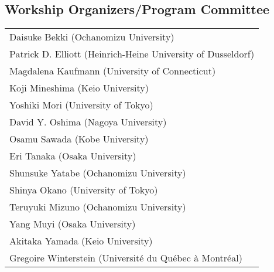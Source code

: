 \documentclass[12pt]{jarticle}
\begin{document}
\subsection*{Workship Organizers/Program Committee}
\begin{flushleft}
\begin{tabular}{l}
Daisuke Bekki (Ochanomizu University) \\
Patrick D. Elliott (Heinrich-Heine University of Dusseldorf) \\
Magdalena Kaufmann (University of Connecticut) \\
Koji Mineshima (Keio University) \\
Yoshiki Mori (University of Tokyo) \\
David Y. Oshima (Nagoya University) \\
Osamu Sawada (Kobe University) \\
Eri Tanaka (Osaka University) \\
Shunsuke Yatabe (Ochanomizu University) \\
Shinya Okano (University of Tokyo) \\
Teruyuki Mizuno (Ochanomizu University) \\
Yang Muyi (Osaka University) \\
Akitaka Yamada (Keio University) \\
Gregoire Winterstein (Université du Québec à Montréal) \\

\end{tabular}
\end{flushleft}
\newpage
  
  
\end{document}
